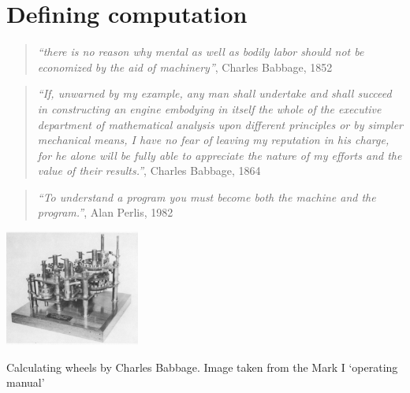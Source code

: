 \chapter{Defining computation}\label{compchap}


\begin{quote}
\emph{``there is no reason why mental as well as bodily labor should not
be economized by the aid of machinery''}, Charles Babbage, 1852
\end{quote}

\begin{quote}
\emph{``If, unwarned by my example, any man shall undertake and shall
succeed in constructing an engine embodying in itself the whole of the
executive department of mathematical analysis upon different principles
or by simpler mechanical means, I have no fear of leaving my reputation
in his charge, for he alone will be fully able to appreciate the nature
of my efforts and the value of their results.''}, Charles Babbage, 1864
\end{quote}

\begin{quote}
\emph{``To understand a program you must become both the machine and the
program.''}, Alan Perlis, 1982
\end{quote}


\begin{marginfigure}
\centering
\includegraphics[width=\linewidth, height=1.5in, keepaspectratio]{../figure/wheels_babbage.png}
\caption{Calculating wheels by Charles Babbage. Image taken from the
Mark I `operating manual'}
\label{babbagewheels}
\end{marginfigure}


